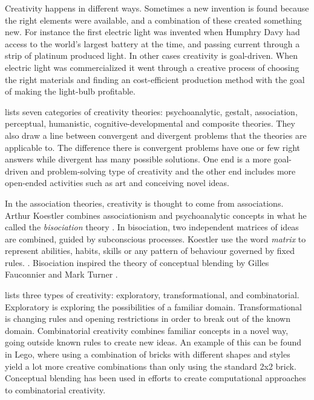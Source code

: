 Creativity happens in different ways. Sometimes a new invention is found because the right elements were available, and a combination of these created something new. For instance the first electric light was invented when Humphry Davy had access to the world's largest battery at the time, and passing current through a strip of platinum produced light. In other cases creativity is goal-driven. When electric light was commercialized it went through a creative process of choosing the right materials and finding an cost-efficient production method with the goal of making the light-bulb profitable.

\citet{busse1980theories} lists seven categories of creativity theories: psychoanalytic, gestalt, association, perceptual, humanistic, cognitive-developmental and composite theories.
They also draw a line between convergent and divergent problems that the theories are applicable to. The difference there is convergent problems have one or few right answers while divergent has many possible solutions. One end is a more goal-driven and problem-solving type of creativity and the other end includes more open-ended activities such as art and conceiving novel ideas.

In the association theories, creativity is thought to come from associations.
Arthur Koestler combines associationism and psychoanalytic concepts in what he called the \emph{bisociation} theory \parencite{busse1980theories}.
In bisociation, two independent matrices of ideas are combined, guided by subconscious processes.
Koestler use the word \emph{matrix} to represent abilities, habits, skills or any pattern of behaviour governed by fixed rules. \parencite{koestler1964act}.
Bisociation inspired the theory of conceptual blending by Gilles Fauconnier and Mark Turner \parencite{fauconnier2002way}.

\citet{boden2004creative} lists three types of creativity: exploratory, transformational, and combinatorial. Exploratory is exploring the possibilities of a familiar domain. Transformational is changing rules and opening restrictions in order to break out of the known domain. Combinatorial creativity combines familiar concepts in a novel way, going outside known rules to create new ideas. An example of this can be found in Lego, where using a combination of bricks with different shapes and styles yield a lot more creative combinations than only using the standard 2x2 brick. \parencite{brainpickings} Conceptual blending has been used in efforts to create computational approaches to combinatorial creativity.

